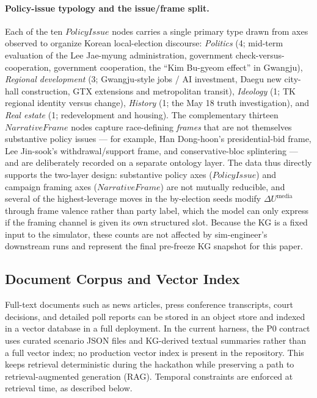 \documentclass[11pt]{article}
\begin{document}
\paragraph{Policy-issue typology and the issue/frame split.}
Each of the ten $PolicyIssue$ nodes carries a single primary type drawn from axes observed to organize Korean local-election discourse: \emph{Politics} (4; mid-term evaluation of the Lee Jae-myung administration, government check-versus-cooperation, government cooperation, the ``Kim Bu-gyeom effect'' in Gwangju), \emph{Regional development} (3; Gwangju-style jobs / AI investment, Daegu new city-hall construction, GTX extensions and metropolitan transit), \emph{Ideology} (1; TK regional identity versus change), \emph{History} (1; the May 18 truth investigation), and \emph{Real estate} (1; redevelopment and housing). The complementary thirteen $NarrativeFrame$ nodes capture race-defining \emph{frames} that are not themselves substantive policy issues --- for example, Han Dong-hoon's presidential-bid frame, Lee Jin-sook's withdrawal/support frame, and conservative-bloc splintering --- and are deliberately recorded on a separate ontology layer. The data thus directly supports the two-layer design: substantive policy axes ($PolicyIssue$) and campaign framing axes ($NarrativeFrame$) are not mutually reducible, and several of the highest-leverage moves in the by-election seeds modify $\Delta U^{\text{media}}$ through frame valence rather than party label, which the model can only express if the framing channel is given its own structured slot. Because the KG is a fixed input to the simulator, these counts are not affected by sim-engineer's downstream runs and represent the final pre-freeze KG snapshot for this paper.

\subsection{Document Corpus and Vector Index}

Full-text documents such as news articles, press conference transcripts, court decisions, and detailed poll reports can be stored in an object store and indexed in a vector database in a full deployment. In the current harness, the P0 contract uses curated scenario JSON files and KG-derived textual summaries rather than a full vector index; no production vector index is present in the repository. This keeps retrieval deterministic during the hackathon while preserving a path to retrieval-augmented generation (RAG). Temporal constraints are enforced at retrieval time, as described below.
\end{document}
